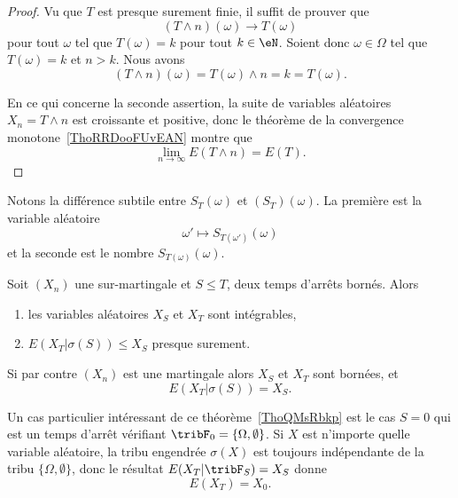 \begin{proof}
	Vu que \( T \) est presque surement finie, il suffit de prouver que
	\begin{equation}    \label{EqRVoKxsN}
		(T\wedge n)(\omega)\to T(\omega)
	\end{equation}
	pour tout \( \omega\) tel que \( T(\omega)=k\) pour tout \( k\in \eN\). Soient donc \( \omega\in \Omega\) tel que \( T(\omega)=k\) et \( n>k\). Nous avons
	\begin{equation}
		(T\wedge n)(\omega)=T(\omega)\wedge n=k=T(\omega).
	\end{equation}

	En ce qui concerne la seconde assertion, la suite de variables aléatoires \( X_n=T\wedge n\) est croissante et positive, donc le théorème de la convergence monotone~\ref{ThoRRDooFUvEAN} montre que
	\begin{equation}
		\lim_{n\to \infty}E(T\wedge n)=E(T).
	\end{equation}
\end{proof}

\begin{remark}
	Notons la différence subtile entre \( S_T(\omega)\) et \( (S_T)(\omega)\). La première est la variable aléatoire
	\begin{equation}
		\omega'\mapsto S_{T(\omega')}(\omega)
	\end{equation}
	et la seconde est le nombre \( S_{T(\omega)}(\omega)\).
\end{remark}

\begin{theorem}   \label{ThoQMsRbkp}
	Soit \( (X_n)\) une sur-martingale et \( S\leq T\), deux temps d'arrêts bornés. Alors
	\begin{enumerate}
		\item
		      les variables aléatoires \( X_{S}\) et \( X_{T}\) sont intégrables,
		\item
		      \( E(X_{T}|  \sigma(S) )\leq X_{S}\) presque surement.
	\end{enumerate}
	Si par contre \( (X_n)\) est une martingale alors \( X_{S}\) et \( X_{T}\) sont bornées, et
	\begin{equation}
		E(X_{T}|\sigma(S))=X_{S}.
	\end{equation}
\end{theorem}

\begin{remark}  \label{RemKCdpnid}
	Un cas particulier intéressant de ce théorème~\ref{ThoQMsRbkp} est le cas \( S=0\) qui est un temps d'arrêt vérifiant \( \tribF_0=\{ \Omega,\emptyset \}\). Si \( X\) est n'importe quelle variable aléatoire, la tribu engendrée \( \sigma(X)\) est toujours indépendante de la tribu \( \{ \Omega,\emptyset \}\), donc le résultat \( E(X_T|\tribF_S)=X_S\) donne
	\begin{equation}
		E(X_T)=X_0.
	\end{equation}
\end{remark}

